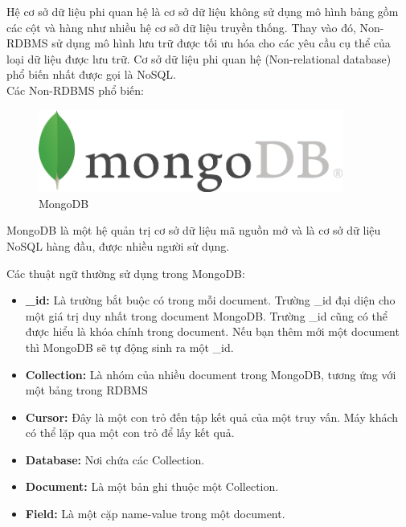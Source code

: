 Hệ cơ sở dữ liệu phi quan hệ là cơ sở dữ liệu không sử dụng mô hình bảng gồm các cột và hàng như nhiều hệ cơ sở dữ liệu truyền thống. Thay vào đó, Non-RDBMS sử dụng mô hình lưu trữ được tối ưu hóa cho các yêu cầu cụ thể của loại dữ liệu được lưu trữ. Cơ sở dữ liệu phi quan hệ (Non-relational database) phổ biến nhất được gọi là NoSQL.\\
Các Non-RDBMS phổ biến:
\begin{figure}[!h]
    \centering
    \includegraphics[width=10cm]{img/mongo.png}
    \caption{MongoDB}
\end{figure}

MongoDB là một hệ quản trị cơ sở dữ liệu mã nguồn mở và là cơ sở dữ liệu NoSQL hàng đầu, được nhiều người sử dụng.

Các thuật ngữ thường sử dụng trong MongoDB:
\begin{itemize}
    \item \textbf{\_id:} Là trường bắt buộc có trong mỗi document. Trường \_id đại diện cho một giá trị duy nhất trong document MongoDB. Trường \_id cũng có thể được hiểu là khóa chính trong document. Nếu bạn thêm mới một document thì MongoDB sẽ tự động sinh ra một \_id.
    \item \textbf{Collection:} Là nhóm của nhiều document trong MongoDB, tương ứng với một bảng trong RDBMS
    \item \textbf{Cursor:} Đây là một con trỏ đến tập kết quả của một truy vấn. Máy khách có thể lặp qua một con trỏ để lấy kết quả.
    \item \textbf{Database:} Nơi chứa các Collection.
    \item \textbf{Document:} Là một bản ghi thuộc một Collection.
    \item \textbf{Field:} Là một cặp name-value trong một document.
\end{itemize}

